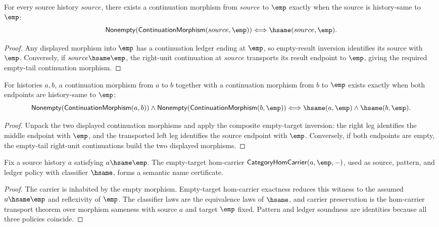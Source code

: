 \begin{theorem}
\label{thm:continuation-morphism-empty-target-nonempty-iff}
For every source history $source$, there exists a continuation morphism from
$source$ to $\emp$ exactly when the source is history-same to $\emp$:
$$
\mathsf{Nonempty}(\mathsf{ContinuationMorphism}(source,\emp))
\Longleftrightarrow
\hsame(source,\emp).
$$
\end{theorem}
\begin{proof}
Any displayed morphism into $\emp$ has a continuation ledger ending at
$\emp$, so empty-result inversion identifies its source with $\emp$.
Conversely, if $source\hsame\emp$, the right-unit continuation at $source$
transports its result endpoint to $\emp$, giving the required empty-tail
continuation morphism.
\end{proof}

\begin{theorem}
\label{thm:continuation-morphism-chain-empty-target-nonempty-iff}
For histories $a,b$, a continuation morphism from $a$ to $b$ together with a
continuation morphism from $b$ to $\emp$ exists exactly when both endpoints are
history-same to $\emp$:
$$
\mathsf{Nonempty}(\mathsf{ContinuationMorphism}(a,b))\land
\mathsf{Nonempty}(\mathsf{ContinuationMorphism}(b,\emp))
\Longleftrightarrow
\hsame(a,\emp)\land\hsame(b,\emp).
$$
\end{theorem}
\begin{proof}
Unpack the two displayed continuation morphisms and apply the composite
empty-target inversion: the right leg identifies the middle endpoint with
$\emp$, and the transported left leg identifies the source endpoint with
$\emp$. Conversely, if both endpoints are empty, the empty-tail right-unit
continuations build the two displayed morphisms.
\end{proof}

\begin{theorem}
\label{thm:category-empty-target-semantic-namecert}
Fix a source history \(a\) satisfying \(a\hsame\emp\). The empty-target
hom-carrier \(\mathsf{CategoryHomCarrier}(a,\emp,-)\), used as source,
pattern, and ledger policy with classifier \(\hsame\), forms a semantic name
certificate.
\end{theorem}
\begin{proof}
The carrier is inhabited by the empty morphism. Empty-target hom-carrier
exactness reduces this witness to the assumed \(a\hsame\emp\) and reflexivity
of \(\emp\). The classifier laws are the equivalence laws of \(\hsame\), and
carrier preservation is the hom-carrier transport theorem over morphism
sameness with source \(a\) and target \(\emp\) fixed. Pattern and ledger
soundness are identities because all three policies coincide.
\end{proof}

